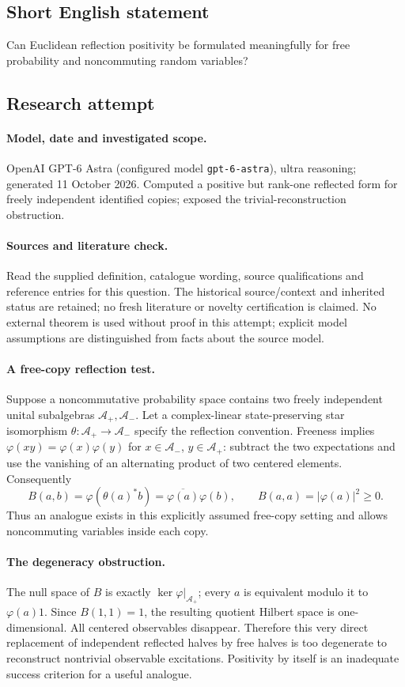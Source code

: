 \documentclass[11pt]{article}
\begin{document}
\subsection{Short English statement}
Can Euclidean reflection positivity be formulated meaningfully for free probability and noncommuting random variables?
\subsection{Research attempt}
\paragraph{Model, date and investigated scope.}
OpenAI GPT-6 Astra (configured model \texttt{gpt-6-astra}), ultra reasoning; generated 11 October 2026. Computed a positive but rank-one reflected form for freely independent identified copies; exposed the trivial-reconstruction obstruction.

\paragraph{Sources and literature check.}
Read the supplied definition, catalogue wording, source qualifications and reference entries for this question. The historical source/context and inherited status are retained; no fresh literature or novelty certification is claimed. No external theorem is used without proof in this attempt; explicit model assumptions are distinguished from facts about the source model.

\paragraph{A free-copy reflection test.} Suppose a noncommutative probability space contains two freely independent unital subalgebras \(\mathcal A_+,\mathcal A_-\). Let a complex-linear state-preserving star isomorphism \(\theta:\mathcal A_+\to\mathcal A_-\) specify the reflection convention. Freeness implies \(\varphi(xy)=\varphi(x)\varphi(y)\) for \(x\in\mathcal A_-\), \(y\in\mathcal A_+\): subtract the two expectations and use the vanishing of an alternating product of two centered elements. Consequently
\[
 B(a,b)=\varphi(\theta(a)^*b)=\overline{\varphi(a)}\varphi(b),\qquad
 B(a,a)=|\varphi(a)|^2\ge0.
\]
Thus an analogue exists in this explicitly assumed free-copy setting and allows noncommuting variables inside each copy.
\paragraph{The degeneracy obstruction.} The null space of \(B\) is exactly \(\ker\varphi|_{\mathcal A_+}\); every \(a\) is equivalent modulo it to \(\varphi(a)1\). Since \(B(1,1)=1\), the resulting quotient Hilbert space is one-dimensional. All centered observables disappear. Therefore this very direct replacement of independent reflected halves by free halves is too degenerate to reconstruct nontrivial observable excitations. Positivity by itself is an inadequate success criterion for a useful analogue.
\end{document}

